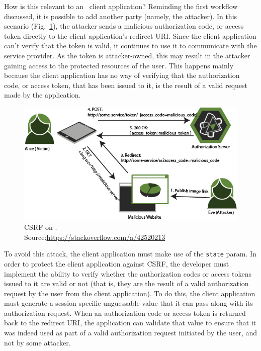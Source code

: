 How is this relevant to an \oauth\ client application? 
Reminding the first workflow discussed, it is possible to add another party (namely, the attacker). In this scenario (Fig.~\ref{fig:csrf}), the attacker sends a malicious authorization code, or access token directly to the client application's redirect URI. Since the client application can't verify that the token is valid, it continues to use it to communicate with the service provider. As the token is attacker-owned, this may result in the attacker gaining access to the protected resources of the user.
This happens mainly because the client application has no way of verifying that the authorization code, or access token, that has been issued to it, is the result of a valid request made by the application.

\begin{figure}[ht]
    \centering
    \includegraphics[scale=0.65]{chapters/images/chp4/csrf.png}
    \caption[CSRF on \oauth]{CSRF on \oauth.\\\hspace{\textwidth}Source:\hspace{0.2cm}\url{https://stackoverflow.com/a/42520213}}
    \label{fig:csrf}
\end{figure}

To avoid this attack, the client application must make use of the \texttt{state} param.
In order to protect the client application against CSRF, the developer must implement the ability to verify whether the authorization codes or access tokens issued to it are valid or not (that is, they are the result of a valid authorization request by the user from the client application). To do this, the client application must generate a session-specific unguessable value that it can pass along with its authorization request. When an authorization code or access token is returned back to the redirect URI, the application can validate that value to ensure that it was indeed used as part of a valid authorization request initiated by the user, and not by some attacker.

